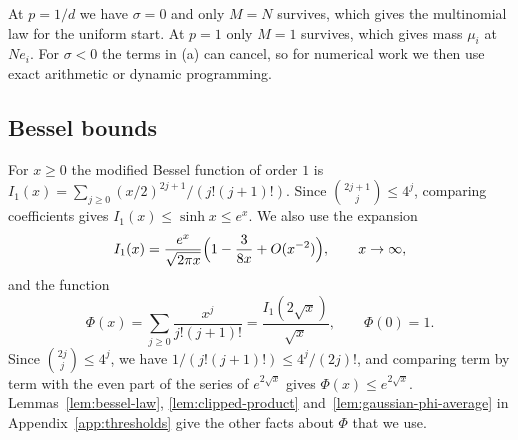 At $p=1/d$ we have $\sigma=0$ and only $M=N$ survives, which gives the
multinomial law for the uniform start. At $p=1$ only $M=1$ survives, which gives
mass $\mu_i$ at $Ne_i$. For $\sigma<0$ the terms in (a) can cancel, so for
numerical work we then use exact arithmetic or dynamic programming.

\subsection{Bessel bounds}

For $x\ge0$ the modified Bessel function of order $1$ is
$I_1(x)=\sum_{j\ge0}(x/2)^{2j+1}/(j!(j+1)!)$. Since
$\binom{2j+1}j\le4^j$, comparing coefficients gives $I_1(x)\le\sinh x\le e^x$.
We also use the expansion~\cite[Eqs.~10.40.1 and~10.17.1]{dlmf}
\[
I_1(x)=\frac{e^x}{\sqrt{2\pi x}}\Bigl(1-\frac3{8x}+O(x^{-2})\Bigr),
\qquad x\to\infty,
\]
and the function
\[
\Phi(x)=\sum_{j\ge0}\frac{x^j}{j!(j+1)!}=\frac{I_1(2\sqrt x)}{\sqrt x},
\qquad\Phi(0)=1 .
\]
Since $\binom{2j}j\le4^j$, we have $1/(j!(j+1)!)\le4^j/(2j)!$, and comparing term
by term with the even part of the series of $e^{2\sqrt x}$ gives
$\Phi(x)\le e^{2\sqrt x}$. Lemmas~\ref{lem:bessel-law}, \ref{lem:clipped-product}
and~\ref{lem:gaussian-phi-average} in Appendix~\ref{app:thresholds} give the
other facts about $\Phi$ that we use.
